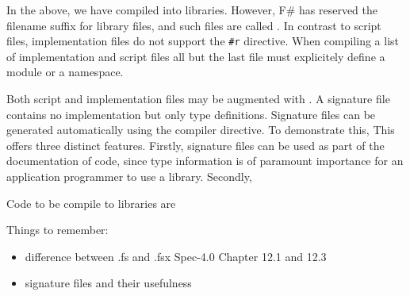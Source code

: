 In the above, we have compiled  into libraries. However, F\# has reserved the  filename suffix for library files, and such files are called . In contrast to script files, implementation files do not support the \lstinline{#r} directive. When compiling a list of implementation and script files all but the last file must explicitely define a module or a namespace.

Both script and implementation files may be augmented with . A signature file contains no implementation but only type definitions. Signature files can be generated automatically using the  compiler directive. To demonstrate this, This offers three distinct features. Firstly, signature files can be used as part of the documentation of code, since type information is of paramount importance for an application programmer to use a library. Secondly, 


Code to be compile to libraries are 

Things to remember: 
\begin{itemize}
\item difference between .fs and .fsx Spec-4.0 Chapter 12.1 and 12.3
\item signature files and their usefulness
\end{itemize}


